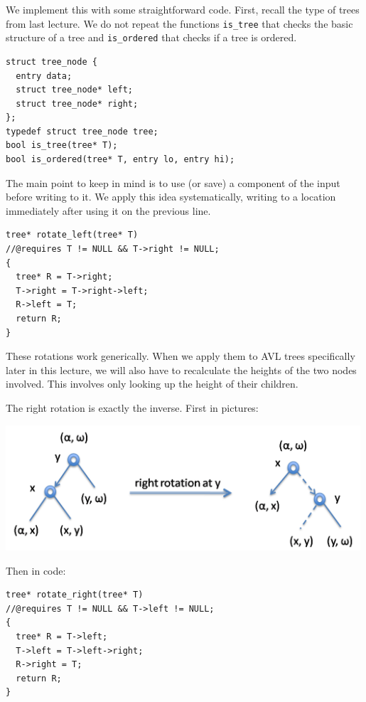 We implement this with some straightforward code.  First, recall
the type of trees from last lecture.  We do not repeat the functions
\lstinline'is_tree' that checks the basic structure of a tree and
\lstinline'is_ordered' that checks if a tree is ordered.
\begin{lstlisting}[language={[C0]C}]
struct tree_node {
  entry data;
  struct tree_node* left;
  struct tree_node* right;
};
typedef struct tree_node tree;
bool is_tree(tree* T);
bool is_ordered(tree* T, entry lo, entry hi);
\end{lstlisting}
The main point to
keep in mind is to use (or save) a component of the input before
writing to it.  We apply this idea systematically, writing to
a location immediately after using it on the previous line.
\begin{lstlisting}[language={[C0]C}]
tree* rotate_left(tree* T)
//@requires T != NULL && T->right != NULL;
{
  tree* R = T->right;
  T->right = T->right->left;
  R->left = T;
  return R;
}
\end{lstlisting}
These rotations work generically.  When we apply them to AVL trees
specifically later in this lecture, we will also have to recalculate
the heights of the two nodes involved.  This involves only looking up
the height of their children.

The right rotation is exactly the inverse.  First in pictures:
\begin{center}
  \includegraphics[width=0.99\textwidth]{img/avl6.png}
\end{center}
Then in code:
\begin{lstlisting}[language={[C0]C}]
tree* rotate_right(tree* T)
//@requires T != NULL && T->left != NULL;
{
  tree* R = T->left;
  T->left = T->left->right;
  R->right = T;
  return R;
}
\end{lstlisting}



